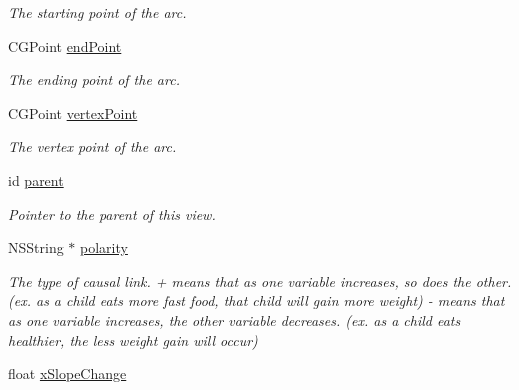 \begin{DoxyCompactItemize}
\begin{DoxyCompactList}\small\item\em The starting point of the arc. \end{DoxyCompactList}\item 
\hypertarget{interface_causal_link_view_a8182eda9bbf2964ae5df72b56cabffb0}{C\-G\-Point \hyperlink{interface_causal_link_view_a8182eda9bbf2964ae5df72b56cabffb0}{end\-Point}}\label{interface_causal_link_view_a8182eda9bbf2964ae5df72b56cabffb0}

\begin{DoxyCompactList}\small\item\em The ending point of the arc. \end{DoxyCompactList}\item 
\hypertarget{interface_causal_link_view_a77f66ca20ad3eb9bbcd3cfe1a99c0c62}{C\-G\-Point \hyperlink{interface_causal_link_view_a77f66ca20ad3eb9bbcd3cfe1a99c0c62}{vertex\-Point}}\label{interface_causal_link_view_a77f66ca20ad3eb9bbcd3cfe1a99c0c62}

\begin{DoxyCompactList}\small\item\em The vertex point of the arc. \end{DoxyCompactList}\item 
\hypertarget{interface_causal_link_view_a4376b99467d16ed71554a4a6ddd4ae0a}{id \hyperlink{interface_causal_link_view_a4376b99467d16ed71554a4a6ddd4ae0a}{parent}}\label{interface_causal_link_view_a4376b99467d16ed71554a4a6ddd4ae0a}

\begin{DoxyCompactList}\small\item\em Pointer to the parent of this view. \end{DoxyCompactList}\item 
\hypertarget{interface_causal_link_view_a90933fdc5eab518a50a919db52d55fc2}{N\-S\-String $\ast$ \hyperlink{interface_causal_link_view_a90933fdc5eab518a50a919db52d55fc2}{polarity}}\label{interface_causal_link_view_a90933fdc5eab518a50a919db52d55fc2}

\begin{DoxyCompactList}\small\item\em The type of causal link. + means that as one variable increases, so does the other. (ex. as a child eats more fast food, that child will gain more weight) -\/ means that as one variable increases, the other variable decreases. (ex. as a child eats healthier, the less weight gain will occur) \end{DoxyCompactList}\item 
\hypertarget{interface_causal_link_view_a556c38ae1a0c294ce33d9e3e40c656a4}{float \hyperlink{interface_causal_link_view_a556c38ae1a0c294ce33d9e3e40c656a4}{x\-Slope\-Change}}\label{interface_causal_link_view_a556c38ae1a0c294ce33d9e3e40c656a4}


\end{DoxyCompactItemize}
